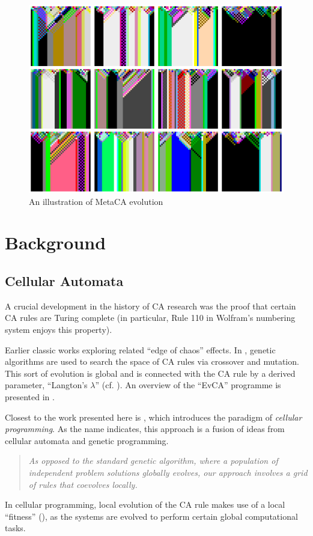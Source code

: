 \documentclass{AISB2008}
\newcommand*{\sourceatright}[1]{\unskip\hspace{1em plus 1fill}%
\nolinebreak[3]\hspace*{\fill}\mbox{#1}}%
\begin{document}
\begin{figure}
\includegraphics[width=\columnwidth]{metaca.png}
\caption{An illustration of MetaCA evolution\label{metaca-taster}}
\end{figure}

\newpage

\section{Background}

\subsection{Cellular Automata}

A crucial development in the history of CA research was the proof
\cite{cook2004universality} that certain CA rules are Turing complete
(in particular, Rule 110 in Wolfram's numbering system
\cite{wolfram1994cellular} enjoys this property).

Earlier classic works
\cite{langton1990computation,mitchell1993revisiting,packard1988adaptation}
exploring related ``edge of chaos'' effects.  In
\cite{packard1988adaptation,mitchell1993revisiting,mitchell1994evolving},
genetic algorithms are used to search the space of CA rules via
crossover and mutation.  This sort of evolution is global and is
connected with the CA rule by a derived parameter, ``Langton's
$\lambda$'' (cf. \cite{langton1990computation}).  An overview of the
``EvCA'' programme is presented in \cite{hordijk2013evca}.

Closest to the work presented here is \cite{sipper1997evolution},
which introduces the paradigm of \emph{cellular programming}.  As the
name indicates, this approach is a fusion of ideas from cellular
automata and genetic programming.
\begin{quote}
\emph{As opposed to the standard genetic algorithm, where a population
  of independent problem solutions globally evolves, our approach
  involves a grid of rules that coevolves locally.}
\sourceatright{\cite[p. 74]{sipper1997evolution}}
\end{quote}
In cellular programming, local evolution of the CA rule makes use of a
local ``fitness'' (\cite[pp. 79--81]{sipper1997evolution}), as the
systems are evolved to perform certain global computational tasks.
\end{document}
